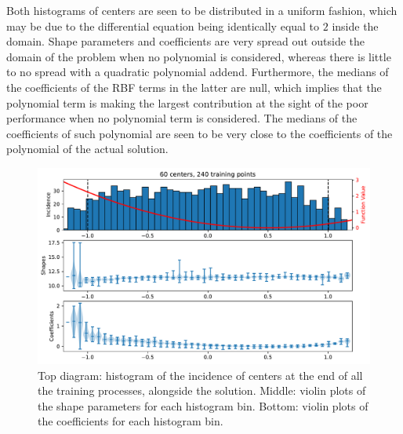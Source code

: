 \documentclass[12pt]{report} %
\begin{document}
Both histograms of centers are seen to be distributed in a uniform fashion, which may be due to the differential equation being identically equal to $2$ inside the domain. Shape parameters and coefficients are very spread out outside the domain of the problem when no polynomial is considered, whereas there is little to no spread with a quadratic polynomial addend. Furthermore, the medians of the coefficients of the RBF terms in the latter are null, which implies that the polynomial term is making the largest contribution at the sight of the poor performance when no polynomial term is considered. The medians of the coefficients of such polynomial are seen to be very close to the coefficients of the polynomial of the actual solution.

\begin{figure}
  \includegraphics[width=\textwidth]{imagenes/experiments/1d/ode/C60-TR240-poly-1.pdf}
  \caption{Top diagram: histogram of the incidence of centers at the end of all the training processes, alongside the solution. Middle: violin plots of the shape parameters for each histogram bin. Bottom: violin plots of the coefficients for each histogram bin.}
  \label{fig:tripleplot-ode-poly-1}
\end{figure}
\end{document}
